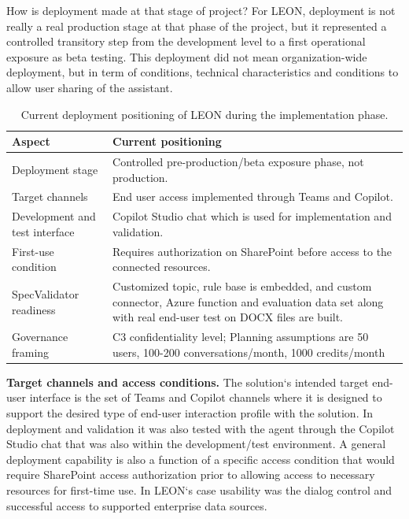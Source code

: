 How is deployment made at that stage of project? For LEON, deployment is not really a real production stage at that phase of the project, but it represented a controlled transitory step from the development level to a first operational exposure as beta testing. This deployment did not mean organization-wide deployment, but in term of conditions, technical characteristics and conditions to allow user sharing of the assistant.
\begin{table}[H]
\centering
\footnotesize
\renewcommand{\arraystretch}{1.2}
\caption{Current deployment positioning of LEON during the implementation phase.}
\label{tab:leon-deployment-positioning}
\begin{tabularx}{\textwidth}{|p{3.4cm}|X|}
\hline
\rowcolor[HTML]{E6F2FF}\textcolor[HTML]{003D99}{\textbf{Aspect}} & \textcolor[HTML]{003D99}{\textbf{Current positioning}} \\
\hline
Deployment stage & Controlled pre-production/beta exposure phase, not production. \\
\hline
Target channels & End user access implemented through Teams and Copilot. \\
\hline
Development and test interface & Copilot Studio chat which is used for implementation and validation. \\
\hline
First-use condition & Requires authorization on SharePoint before access to the connected resources. \\
\hline
SpecValidator readiness & Customized topic, rule base is embedded, and custom connector, Azure function and evaluation data set along with real end-user test on DOCX files are built. \\
\hline
Governance framing & C3 confidentiality level; Planning assumptions are 50 users, 100-200 conversations/month, 1000 credits/month \\
\hline
\end{tabularx}
\end{table}

\noindent\textbf{Target channels and access conditions.} The solution‘s intended target end-user interface is the set of Teams and Copilot channels where it is designed to support the desired type of end-user interaction profile with the solution. In deployment and validation it was also tested with the agent through the Copilot Studio chat that was also within the development/test environment. A general deployment capability is also a function of a specific access condition that would require SharePoint access authorization prior to allowing access to necessary resources for first-time use. In LEON‘s case usability was the dialog control and successful access to supported enterprise data sources.\\

